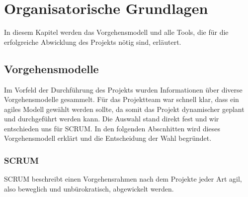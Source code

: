 \chapter{Organisatorische Grundlagen}
In diesem Kapitel werden das Vorgehensmodell und alle Tools, die für die erfolgreiche
Abwicklung des Projekts nötig sind, erläutert.

\section{Vorgehensmodelle}
Im Vorfeld der Durchführung des Projekts wurden Informationen über diverse Vorgehensmodelle
gesammelt. Für das Projektteam war schnell klar, dass ein agiles Modell gewählt werden sollte,
da somit das Projekt dynamischer geplant und durchgeführt werden kann. Die Auswahl stand direkt
fest und wir entschieden uns für SCRUM. In den folgenden Abscnhitten wird dieses Vorgehensmodell
erklärt und die Entscheidung der Wahl begründet.

\subsection{SCRUM}
SCRUM beschreibt einen Vorgehensrahmen nach dem Projekte jeder Art agil, also beweglich
und unbürokratisch, abgewickelt werden.\\

